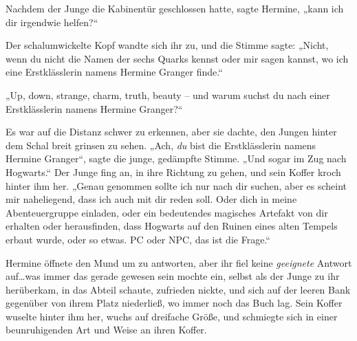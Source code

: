 Nachdem der Junge die Kabinentür geschlossen hatte, sagte Hermine, „kann ich dir irgendwie helfen?“

Der schalumwickelte Kopf wandte sich ihr zu, und die Stimme sagte: „Nicht, wenn du nicht die Namen der sechs Quarks kennst oder mir sagen kannst, wo ich eine Erstklässlerin namens Hermine Granger finde.“

„Up, down, strange, charm, truth, beauty – und warum suchst du nach einer Erstklässlerin namens Hermine Granger?“

Es war auf die Distanz schwer zu erkennen, aber sie dachte, den Jungen hinter dem Schal breit grinsen zu sehen. „Ach, \emph{du} bist die Erstklässlerin namens Hermine Granger“, sagte die junge, gedämpfte Stimme. „Und sogar im Zug nach Hogwarts.“ Der Junge fing an, in ihre Richtung zu gehen, und sein Koffer kroch hinter ihm her. „Genau genommen sollte ich nur nach dir suchen, aber es scheint mir naheliegend, dass ich auch mit dir reden soll. Oder dich in meine Abenteuergruppe einladen, oder ein bedeutendes magisches Artefakt von dir erhalten oder herausfinden, dass Hogwarts auf den Ruinen eines alten Tempels erbaut wurde, oder so etwas. PC oder NPC, das ist die Frage.“

Hermine öffnete den Mund um zu antworten, aber ihr fiel keine \emph{geeignete} Antwort auf…was immer das gerade gewesen sein mochte ein, selbst als der Junge zu ihr herüberkam, in das Abteil schaute, zufrieden nickte, und sich auf der leeren Bank gegenüber von ihrem Platz niederließ, wo immer noch das Buch lag. Sein Koffer wuselte hinter ihm her, wuchs auf dreifache Größe, und schmiegte sich in einer beunruhigenden Art und Weise an ihren Koffer.

